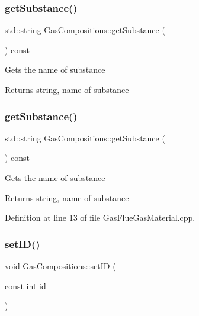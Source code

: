 \subsubsection{\texorpdfstring{get\+Substance()}{getSubstance()}\hspace{0.1cm}{\footnotesize\ttfamily [2/3]}}
{\footnotesize\ttfamily std\+::string Gas\+Compositions\+::get\+Substance (\begin{DoxyParamCaption}{ }\end{DoxyParamCaption}) const}

Gets the name of substance \begin{DoxyReturn}{Returns}
string, name of substance 
\end{DoxyReturn}
\mbox{\label{class_gas_compositions_abad9554bca9b68cd970eae11bdd3c505}} 
\subsubsection{\texorpdfstring{get\+Substance()}{getSubstance()}\hspace{0.1cm}{\footnotesize\ttfamily [3/3]}}
{\footnotesize\ttfamily std\+::string Gas\+Compositions\+::get\+Substance (\begin{DoxyParamCaption}{ }\end{DoxyParamCaption}) const}

Gets the name of substance \begin{DoxyReturn}{Returns}
string, name of substance 
\end{DoxyReturn}


Definition at line 13 of file Gas\+Flue\+Gas\+Material.\+cpp.

\mbox{\label{class_gas_compositions_a9fc3ebfcbda7134b67ed76a39b4c94cc}} 
\subsubsection{\texorpdfstring{set\+I\+D()}{setID()}\hspace{0.1cm}{\footnotesize\ttfamily [1/3]}}
{\footnotesize\ttfamily void Gas\+Compositions\+::set\+ID (\begin{DoxyParamCaption}\item[{const int}]{id }\end{DoxyParamCaption})\hspace{0.3cm}{\ttfamily [inline]}}

